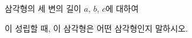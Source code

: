 삼각형의 세 변의 길이 $a$, $b$, $c$에 대하여\par\smallskip{}\par\smallskip\noindent 이 성립할 때, 이 삼각형은 어떤 삼각형인지 말하시오.

